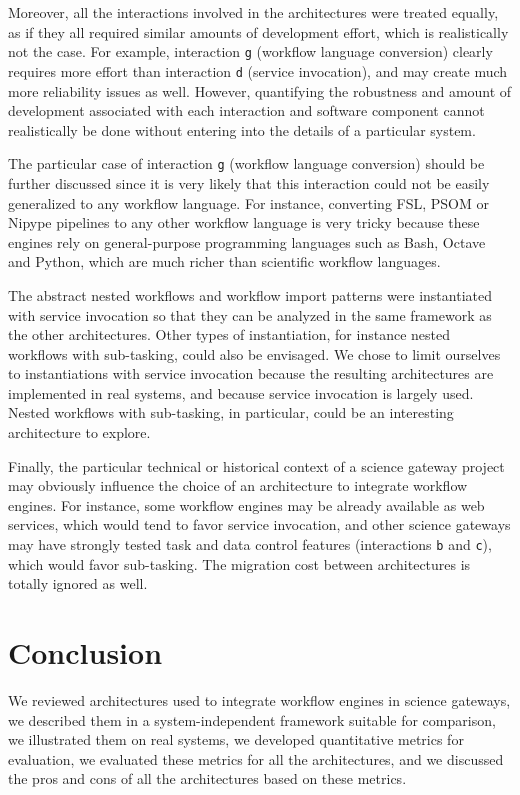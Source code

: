 \documentclass[preprint,3p,twocolumn]{elsarticle}
\begin{document}
Moreover, all the interactions involved in the architectures were
treated equally, as if they all required similar amounts of
development effort, which is realistically not the case. For example,
interaction \texttt{g} (workflow language conversion) clearly requires
more effort than interaction \texttt{d} (service invocation), and may
create much more reliability issues as well. However, quantifying the
robustness and amount of development associated with each interaction
and software component cannot realistically be done without entering
into the details of a particular system.

The particular case of interaction \texttt{g} (workflow language
conversion) should be further discussed since it is very likely that
this interaction could not be easily generalized to any workflow
language. For instance, converting FSL, PSOM or Nipype pipelines to
any other workflow language is very tricky because these engines rely
on general-purpose programming languages such as Bash, Octave and
Python, which are much richer than scientific workflow languages.

The abstract nested workflows and workflow import patterns were
instantiated with service invocation so that they can be analyzed in
the same framework as the other architectures. Other types of
instantiation, for instance nested workflows with sub-tasking, could
also be envisaged. We chose to limit ourselves to instantiations with
service invocation because the resulting architectures are implemented
in real systems, and because service invocation is largely
used. Nested workflows with sub-tasking, in particular, could be an
interesting architecture to explore.

Finally, the particular technical or historical context of a science
gateway project may obviously influence the choice of an architecture
to integrate workflow engines. For instance, some workflow engines may
be already available as web services, which would tend to favor
service invocation, and other science gateways may have strongly
tested task and data control features (interactions \texttt{b} and
\texttt{c}), which would favor sub-tasking. The migration cost between
architectures is totally ignored as well.

\section{Conclusion}

We reviewed architectures used to integrate workflow engines in
science gateways, we described them in a system-independent framework
suitable for comparison, we illustrated them on real systems, we
developed quantitative metrics for evaluation, we evaluated these
metrics for all the architectures, and we discussed the pros and cons
of all the architectures based on these metrics.
\end{document}
